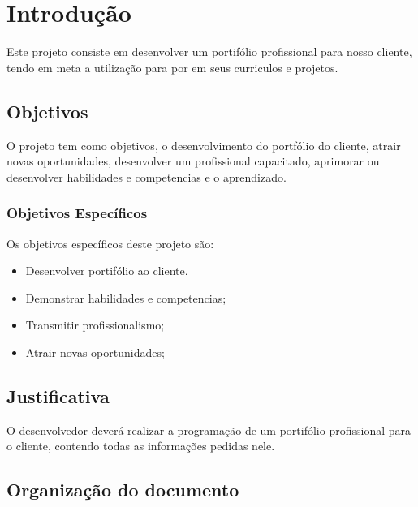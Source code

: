 \chapter{Introdução}
\label{chap:intro}
Este projeto consiste em desenvolver um portifólio profissional para nosso cliente, tendo em meta a utilização para por em seus curriculos e projetos. 

\section{Objetivos}
\label{sec:obj}
O projeto tem como objetivos, o desenvolvimento do portfólio do cliente, atrair novas oportunidades, desenvolver um profissional capacitado, aprimorar ou
desenvolver habilidades e competencias e o aprendizado.

\subsection{Objetivos Específicos}
\label{ssec:objesp}
Os objetivos específicos deste projeto são:
\begin{itemize}
      \item Desenvolver portifólio ao cliente.
      \item Demonstrar habilidades e competencias;
      \item Transmitir profissionalismo;
      \item Atrair novas oportunidades;
  \end{itemize}


\section{Justificativa}
\label{sec:justi}

O desenvolvedor deverá realizar a programação de um portifólio profissional para o cliente, contendo todas as informações pedidas nele.




\section{Organização do documento}
\label{section:organizacao}

